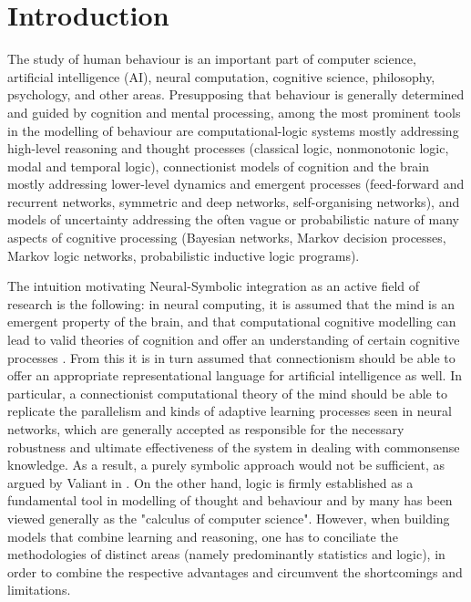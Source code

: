 \chapter{Introduction}
\label{Chapter1}

The study of human behaviour is an important part of computer science, artificial intelligence (AI), neural computation, cognitive science, philosophy, psychology, and other areas. Presupposing that behaviour is generally determined and guided by cognition and mental processing, among the most prominent tools in the modelling of behaviour are computational-logic systems mostly addressing high-level reasoning and thought processes (classical logic, nonmonotonic logic, modal and temporal logic), connectionist models of cognition and the brain mostly addressing lower-level dynamics and emergent processes (feed-forward and recurrent networks, symmetric and deep networks, self-organising networks), and models of uncertainty addressing the often vague or probabilistic nature of many aspects of cognitive processing (Bayesian networks, Markov decision processes, Markov logic networks, probabilistic inductive logic programs).

The intuition motivating Neural-Symbolic integration as an active field of research is the following: in neural computing, it is assumed that the mind is an emergent property of the brain, and that computational cognitive modelling can lead to valid theories of cognition and offer an understanding of certain cognitive processes \cite{10.1016/j.cogsys.2008.07.002}. From this it is in turn assumed that connectionism should be able to offer an appropriate representational language for artificial intelligence as well. In particular, a connectionist computational theory of the mind should be able to replicate the parallelism and kinds of adaptive learning processes seen in neural networks, which are generally accepted as responsible for the necessary robustness and ultimate effectiveness of the system in dealing with commonsense knowledge. As a result, a purely symbolic approach would not be sufficient, as argued by Valiant in \cite{Valiant08knowledgeinfusion:}. On the other hand, logic is firmly established as a fundamental tool in modelling of thought and behaviour \cite{kowalski_2011} and by many has been viewed generally as the "calculus of computer science". However, when building models that combine learning and reasoning, one has to conciliate the methodologies of distinct areas (namely predominantly statistics and logic), in order to combine the respective advantages and circumvent the shortcomings and limitations.

